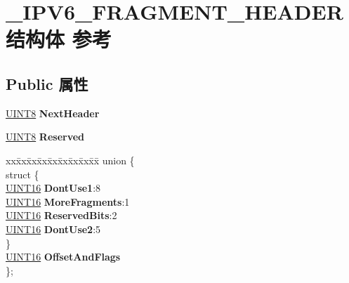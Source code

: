 \hypertarget{struct___i_p_v6___f_r_a_g_m_e_n_t___h_e_a_d_e_r}{}\section{\+\_\+\+I\+P\+V6\+\_\+\+F\+R\+A\+G\+M\+E\+N\+T\+\_\+\+H\+E\+A\+D\+E\+R结构体 参考}
\label{struct___i_p_v6___f_r_a_g_m_e_n_t___h_e_a_d_e_r}
\subsection*{Public 属性}
\begin{DoxyCompactItemize}
\item 
\mbox{\label{struct___i_p_v6___f_r_a_g_m_e_n_t___h_e_a_d_e_r_a9215bfe10139c116cc5f156823b4bbff}} 
\hyperlink{_processor_bind_8h_ab27e9918b538ce9d8ca692479b375b6a}{U\+I\+N\+T8} {\bfseries Next\+Header}
\item 
\mbox{\label{struct___i_p_v6___f_r_a_g_m_e_n_t___h_e_a_d_e_r_a420047b36016ff506b7083a729097b21}} 
\hyperlink{_processor_bind_8h_ab27e9918b538ce9d8ca692479b375b6a}{U\+I\+N\+T8} {\bfseries Reserved}
\item 
\mbox{\label{struct___i_p_v6___f_r_a_g_m_e_n_t___h_e_a_d_e_r_a53a80e3ee15c3e9e5ec8f1d9b42b5469}} 
\begin{tabbing}
xx\=xx\=xx\=xx\=xx\=xx\=xx\=xx\=xx\=\kill
union \{\\
\mbox{\label{union___i_p_v6___f_r_a_g_m_e_n_t___h_e_a_d_e_r_1_1_0D2661_ac1651733a96baa50ac9f7d1b2e746f27}} 
\>struct \{\\
\>\>\hyperlink{_processor_bind_8h_a09f1a1fb2293e33483cc8d44aefb1eb1}{UINT16} {\bfseries DontUse1}:8\\
\>\>\hyperlink{_processor_bind_8h_a09f1a1fb2293e33483cc8d44aefb1eb1}{UINT16} {\bfseries MoreFragments}:1\\
\>\>\hyperlink{_processor_bind_8h_a09f1a1fb2293e33483cc8d44aefb1eb1}{UINT16} {\bfseries ReservedBits}:2\\
\>\>\hyperlink{_processor_bind_8h_a09f1a1fb2293e33483cc8d44aefb1eb1}{UINT16} {\bfseries DontUse2}:5\\
\>\} \\
\>\hyperlink{_processor_bind_8h_a09f1a1fb2293e33483cc8d44aefb1eb1}{UINT16} {\bfseries OffsetAndFlags}\\
\}; \\


\end{tabbing}
\end{DoxyCompactItemize}
